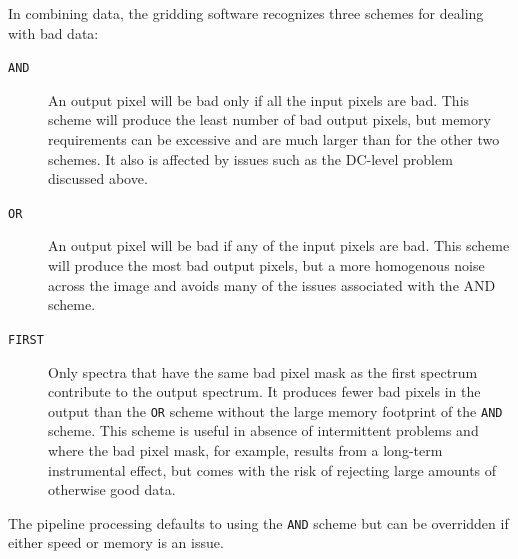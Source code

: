 \documentclass[final,authoryear,5p,times,twocolumn]{elsarticle}
\begin{document}
In combining data, the gridding software recognizes three schemes for
dealing with bad data:
\begin{description}
\item[\texttt{AND}] An output pixel will be bad only if all the input
   pixels are bad. This scheme will produce the least number of bad
   output pixels, but memory requirements can be excessive and are much
   larger than for the other two schemes. It also is affected by issues such
   as the DC-level problem discussed above.
\item[\texttt{OR}] An output pixel will be bad if any of the input
   pixels are bad. This scheme will produce the most bad output pixels,
   but a more homogenous noise across the image and avoids many
   of the issues associated with the AND scheme.
\item[\texttt{FIRST}] Only spectra that have the same bad pixel mask
   as the first spectrum contribute to the output spectrum. It
   produces fewer bad pixels in the output than the \texttt{OR}
   scheme without the large memory footprint of the \texttt{AND} scheme.
   This scheme is useful in absence of intermittent problems and where
   the bad pixel mask, for example, results from a long-term instrumental effect, but
   comes with the risk of rejecting large amounts of otherwise good data.
\end{description}

The pipeline processing defaults to using the \texttt{AND} scheme but
can be overridden if either speed or memory is an issue.
\end{document}
